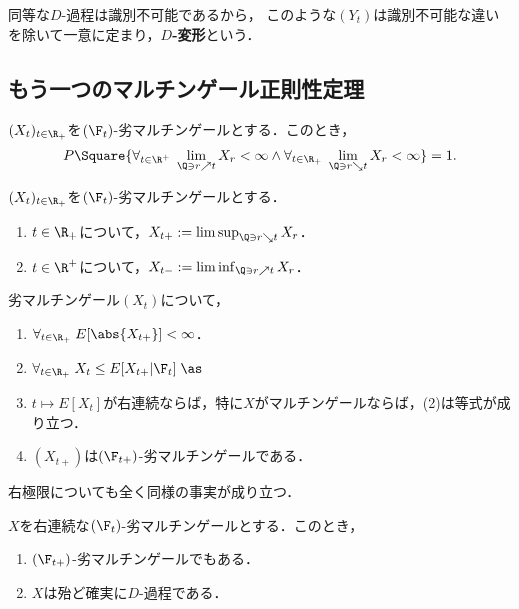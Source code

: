 \documentclass[uplatex,dvipdfmx]{jsreport}
\begin{document}
\begin{definition}[$D$-modification]
    同等な$D$-過程は識別不可能であるから，
    このような$(Y_t)$は識別不可能な違いを除いて一意に定まり，\textbf{$D$-変形}という．
\end{definition}

\subsection{もう一つのマルチンゲール正則性定理}

\begin{theorem}
    $(X_t)_{t\in\R_+}$を$(\F_t)$-劣マルチンゲールとする．このとき，
    \[P\Square{\forall_{t\in\R^+}\;\lim_{\Q\ni r\nearrow t}X_r<\infty\land\forall_{t\in\R_+}\;\lim_{\Q\ni r\searrow t}X_r<\infty}=1.\]
\end{theorem}

\begin{definition}
    $(X_t)_{t\in\R_+}$を$(\F_t)$-劣マルチンゲールとする．
    \begin{enumerate}
        \item $t\in\R_+$について，$X_{t+}:=\limsup_{\Q\ni r\searrow t}X_r$．
        \item $t\in\R^+$について，$X_{t-}:=\liminf_{\Q\ni r\nearrow t}X_r$．
    \end{enumerate}
\end{definition}

\begin{proposition}
    劣マルチンゲール$(X_t)$について，
    \begin{enumerate}
        \item $\forall_{t\in\R_+}\;E[\abs{X_{t+}}]<\infty$．
        \item $\forall_{t\in\R_+}\;X_t\le E[X_{t+}|\F_t]\;\as$
        \item $t\mapsto E[X_t]$が右連続ならば，特に$X$がマルチンゲールならば，(2)は等式が成り立つ．
        \item $(X_{t+})$は$(\F_{t+})$-劣マルチンゲールである．
    \end{enumerate}
    右極限についても全く同様の事実が成り立つ．
\end{proposition}

\begin{theorem}
    $X$を右連続な$(\F_t)$-劣マルチンゲールとする．このとき，
    \begin{enumerate}
        \item $(\F_{t+})$-劣マルチンゲールでもある．
        \item $X$は殆ど確実に$D$-過程である．
    \end{enumerate}
\end{theorem}
\end{document}
